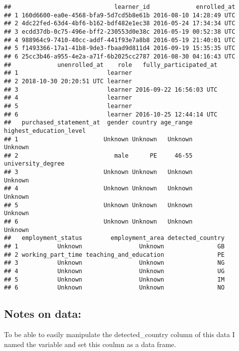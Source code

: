 \documentclass[]{article}
\newenvironment{Shaded}{\begin{snugshade}}{\end{snugshade}}
\newcommand{\KeywordTok}[1]{\textcolor[rgb]{0.13,0.29,0.53}{\textbf{#1}}}
\newcommand{\StringTok}[1]{\textcolor[rgb]{0.31,0.60,0.02}{#1}}
\newcommand{\CommentTok}[1]{\textcolor[rgb]{0.56,0.35,0.01}{\textit{#1}}}
\newcommand{\OperatorTok}[1]{\textcolor[rgb]{0.81,0.36,0.00}{\textbf{#1}}}
\newcommand{\NormalTok}[1]{#1}
\begin{document}
\begin{verbatim}
##                             learner_id             enrolled_at
## 1 160d6600-ea0e-4568-bfa9-5d7cd5b8e61b 2016-08-10 14:28:49 UTC
## 2 4dc22fed-63d4-4bf6-b162-bdf482e1ec38 2016-05-24 17:34:34 UTC
## 3 ecdd37db-0c75-496e-bff2-230553d0e38c 2016-05-19 00:52:38 UTC
## 4 988964c9-7410-40cc-addf-441f93e7a8b8 2016-05-19 21:40:01 UTC
## 5 f1493366-17a1-41b8-9de3-fbaad9d811d4 2016-09-19 15:35:35 UTC
## 6 25cc3b46-a955-4e2a-a71f-6b2025cc2787 2016-08-30 04:16:43 UTC
##             unenrolled_at    role   fully_participated_at
## 1                         learner                        
## 2 2018-10-30 20:20:51 UTC learner                        
## 3                         learner 2016-09-22 16:56:03 UTC
## 4                         learner                        
## 5                         learner                        
## 6                         learner 2016-10-25 12:44:14 UTC
##   purchased_statement_at  gender country age_range highest_education_level
## 1                        Unknown Unknown   Unknown                 Unknown
## 2                           male      PE     46-55       university_degree
## 3                        Unknown Unknown   Unknown                 Unknown
## 4                        Unknown Unknown   Unknown                 Unknown
## 5                        Unknown Unknown   Unknown                 Unknown
## 6                        Unknown Unknown   Unknown                 Unknown
##   employment_status        employment_area detected_country
## 1           Unknown                Unknown               GB
## 2 working_part_time teaching_and_education               PE
## 3           Unknown                Unknown               NG
## 4           Unknown                Unknown               UG
## 5           Unknown                Unknown               IM
## 6           Unknown                Unknown               NO
\end{verbatim}

\subsection{Notes on data:}\label{notes-on-data}

To be able to easily manipulate the detected\_country column of this
data I named the variable and set this coulmn as a data frame.

\begin{Shaded}
\end{Shaded}
\end{document}
